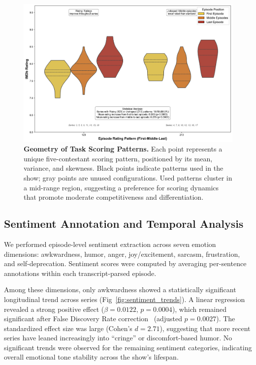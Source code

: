 \documentclass[10pt,letterpaper]{article}
\begin{document}
\begin{figure}[!h]
\centering
\includegraphics[width=\linewidth]{figures/main/Fig8.png}
\caption{{\bf Geometry of Task Scoring Patterns.}
Each point represents a unique five-contestant scoring pattern, positioned by its mean, variance, and skewness. Black points indicate patterns used in the show; gray points are unused configurations. Used patterns cluster in a mid-range region, suggesting a preference for scoring dynamics that promote moderate competitiveness and differentiation.}
\label{fig:scoring_geometry}
\end{figure}
\FloatBarrier



\subsection*{Sentiment Annotation and Temporal Analysis}

We performed episode-level sentiment extraction across seven emotion dimensions: awkwardness, humor, anger, joy/excitement, sarcasm, frustration, and self-deprecation. Sentiment scores were computed by averaging per-sentence annotations within each transcript-parsed episode.

Among these dimensions, only awkwardness showed a statistically significant longitudinal trend across series (Fig~\ref{fig:sentiment_trends}). A linear regression revealed a strong positive effect ($\beta = 0.0122$, $p = 0.0004$), which remained significant after False Discovery Rate correction~\cite{Benjamini1995} (adjusted $p = 0.0027$). The standardized effect size was large (Cohen’s $d = 2.71$), suggesting that more recent series have leaned increasingly into “cringe” or discomfort-based humor. No significant trends were observed for the remaining sentiment categories, indicating overall emotional tone stability across the show’s lifespan.
\end{document}
